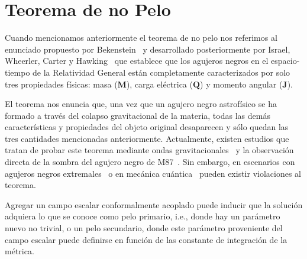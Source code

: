 \documentclass[../Main.tex]{subfiles}
\begin{document}
\section{Teorema de no Pelo}
Cuando mencionamos anteriormente el teorema de no pelo nos referimos al enunciado propuesto por Bekenstein~\cite{PhysRevLett.28.452,PhysRevD.5.1239} y desarrollado posteriormente por Israel, Wheerler, Carter y Hawking~\cite{PhysRevLett.26.331,PhysRev.164.1776} que establece que los agujeros negros en el espacio-tiempo de la Relatividad General están completamente caracterizados por solo tres propiedades físicas: masa ($\mathbf{M}$), carga eléctrica ($\mathbf{Q}$) y momento angular ($\mathbf{J}$). 

El teorema nos enuncia que, una vez que un agujero negro astrofísico se ha formado a través del colapso gravitacional de la materia, todas las demás características y propiedades del objeto original desaparecen y sólo quedan las tres cantidades mencionadas anteriormente. Actualmente, existen estudios que tratan de probar este teorema mediante ondas gravitacionales~\cite{PhysRevLett.123.111102,PhysRev.164.1776} y la observación directa de la sombra del agujero negro de M87~\cite{Tang:2022uwi}. Sin embargo, en escenarios con agujeros negros extremales~\cite{PhysRevD.103.L021502} o en mecánica cuántica~\cite{PhysRevLett.128.111301} pueden existir violaciones al teorema.

Agregar un campo escalar conformalmente acoplado puede inducir que la solución adquiera lo que se conoce como pelo primario, i.e., donde hay un parámetro nuevo no trivial, o un pelo secundario, donde este parámetro proveniente del campo escalar puede definirse en función de las constante de integración de la métrica.
\end{document}
